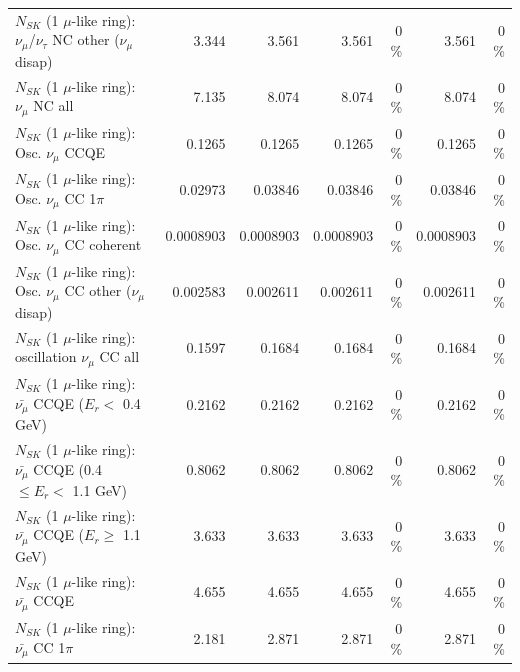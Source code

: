 \begin{table}
\begin{tabular}{| l | r | r | r  r | r  r |}
   $N_{SK}$ (1 $\mu$-like ring): $\nu_\mu$/$\nu_\tau$ NC other ($\nu_\mu$ disap) &           3.344 &           3.561 &           3.561 &        0 \%  &           3.561 &        0 \%  \\ 
                                $N_{SK}$ (1 $\mu$-like ring): $\nu_{\mu}$ NC all &           7.135 &           8.074 &           8.074 &        0 \%  &           8.074 &        0 \%  \\ 
\hline
\hline
                               $N_{SK}$ (1 $\mu$-like ring): Osc. $\nu_\mu$ CCQE &          0.1265 &          0.1265 &          0.1265 &        0 \%  &          0.1265 &        0 \%  \\ 
                          $N_{SK}$ (1 $\mu$-like ring): Osc. $\nu_\mu$ CC 1$\pi$ &         0.02973 &         0.03846 &         0.03846 &        0 \%  &         0.03846 &        0 \%  \\ 
                        $N_{SK}$ (1 $\mu$-like ring): Osc. $\nu_\mu$ CC coherent &       0.0008903 &       0.0008903 &       0.0008903 &        0 \%  &       0.0008903 &        0 \%  \\ 
         $N_{SK}$ (1 $\mu$-like ring): Osc. $\nu_\mu$ CC other ($\nu_\mu$ disap) &        0.002583 &        0.002611 &        0.002611 &        0 \%  &        0.002611 &        0 \%  \\ 
                      $N_{SK}$ (1 $\mu$-like ring): oscillation $\nu_\mu$ CC all &          0.1597 &          0.1684 &          0.1684 &        0 \%  &          0.1684 &        0 \%  \\ 
\hline
\hline
          $N_{SK}$ (1 $\mu$-like ring): $\bar{\nu_\mu}$ CCQE ($E_{r} <$ 0.4 GeV) &          0.2162 &          0.2162 &          0.2162 &        0 \%  &          0.2162 &        0 \%  \\ 
 $N_{SK}$ (1 $\mu$-like ring): $\bar{\nu_\mu}$ CCQE (0.4 $\leq E_{r} <$ 1.1 GeV) &          0.8062 &          0.8062 &          0.8062 &        0 \%  &          0.8062 &        0 \%  \\ 
       $N_{SK}$ (1 $\mu$-like ring): $\bar{\nu_\mu}$ CCQE ($E_{r} \geq$ 1.1 GeV) &           3.633 &           3.633 &           3.633 &        0 \%  &           3.633 &        0 \%  \\ 
\hline
                              $N_{SK}$ (1 $\mu$-like ring): $\bar{\nu_\mu}$ CCQE &           4.655 &           4.655 &           4.655 &        0 \%  &           4.655 &        0 \%  \\ 
                         $N_{SK}$ (1 $\mu$-like ring): $\bar{\nu_\mu}$ CC 1$\pi$ &           2.181 &           2.871 &           2.871 &        0 \%  &           2.871 &        0 \%  \\ 

\end{tabular}
\end{table}
